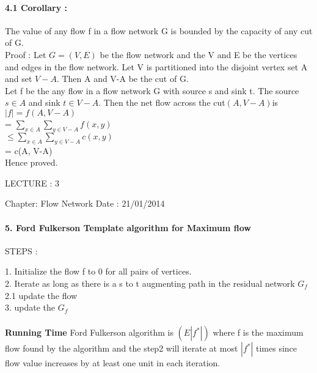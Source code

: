 \documentclass[a4paper,12pt]{article}
\begin{document}
\paragraph*{4.1 Corollary : }
{
       The value of any flow f in a flow network G is bounded by the capacity of any cut of G.   \\
       
       Proof : Let $ G = (V, E) $ be the flow network and the V and E be the vertices and edges in the flow network. Let V is partitioned into the disjoint vertex set A and set $ V - A $. Then A and V-A be the cut of G.  \\
       
       Let f be the any flow in a flow network G with source s and sink t. The source $ s \in A $ and sink $ t \in V-A $. Then the net flow across the cut$ (A,V - A) $is   \\
                $ |f| = f(A, V - A)  $   \\
               
                      = $ \sum_{x \in A}\sum_{y \in V - A}f(x,y) $    \\
                      
                      $ \leq \sum_{x \in A}\sum_{y \in V - A}c(x,y) $    \\
                      = c(A, V-A)   \\
                      
                      Hence proved. 
                                                         
}	

 \pagebreak

	    	\begin{center}
	    	LECTURE : 3
	    	\end{center}
	    	Chapter: Flow Network \hspace*{55mm}Date : 21/01/2014
	    
	    \paragraph*{5. Ford Fulkerson Template algorithm for Maximum flow \\ }
	    {
	           STEPS :
	           
	           1. Initialize the flow f to 0 for all pairs of vertices.   \\
	           2. Iterate  as long as there is a s to t augmenting path in the residual network $ G_{f} $ \\
	                2.1 update the flow  \\
	           3. update the $ G_{f} $     \\ \\
	           
	           
	           
	           
	           \textbf{Running Time} Ford Fulkerson algorithm is  $ (E|f^{*}|) $ where f is the maximum flow found by the algorithm and the step2 will iterate at most $ |f^{*}| $ times since flow value increases by at least one unit in each iteration.
	    
	    
	    
	    }
	    
\end{document}
